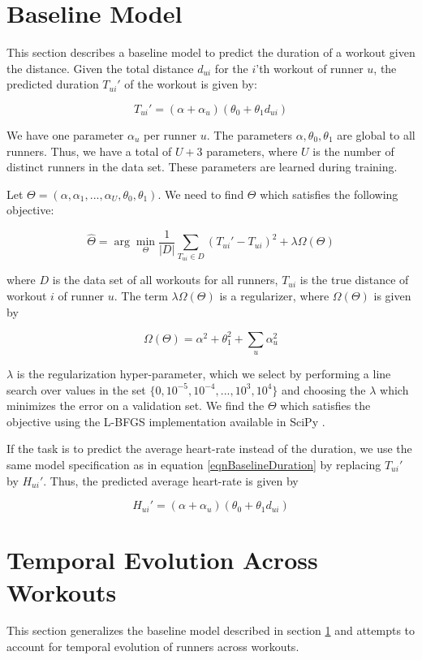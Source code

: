 \documentclass{acm_proc_article-sp}
\begin{document}
\section{Baseline Model}
\label{secBaselineModel}
This section describes a baseline model to predict the duration of a workout given the distance. Given the total distance $d_{ui}$ for the $i$'th workout of runner $u$, the predicted duration $T_{ui}'$ of the workout is given by:

\begin{equation}
\label{eqnBaselineDuration}
T_{ui}' = (\alpha + \alpha_{u})(\theta_0 + \theta_1 d_{ui})
\end{equation}

We have one parameter $\alpha_u$ per runner $u$. The parameters $\alpha, \theta_0, \theta_1$ are global to all runners. Thus, we have a total of $U + 3$ parameters, where $U$ is the number of distinct runners in the data set. These parameters are learned during training.

Let $\Theta = (\alpha, \alpha_1, ... , \alpha_U, \theta_0, \theta_1)$. We need to find $\Theta$ which satisfies the following objective:

$$\hat{\Theta} = \arg\min_{\Theta}\frac{1}{|D|} \sum_{T_{ui} \in D}(T_{ui}' - T_{ui})^2 + \lambda \Omega(\Theta) $$

where $D$ is the data set of all workouts for all runners, $T_{ui}$ is the true distance of workout $i$ of runner $u$. The term $\lambda \Omega(\Theta)$ is a regularizer, where $\Omega(\Theta)$ is given by 

$$\Omega(\Theta) = \alpha^2 + \theta_1^2 + \sum_{u}{\alpha_u^2}$$

$\lambda$ is the regularization hyper-parameter, which we select by performing a line search over values in the set $\{0, 10^{-5}, 10^{-4},...,10^3, 10^{4}\}$ and choosing the $\lambda$ which minimizes the error on a validation set. We find the $\Theta$ which satisfies the objective using the L-BFGS \cite{lbfgs} implementation available in SciPy \cite{scipy}.

If the task is to predict the average heart-rate instead of the duration, we use the same model specification as in equation \ref{eqnBaselineDuration} by replacing $T_{ui}'$ by $H_{ui}'$. Thus, the predicted average heart-rate is given by

$$H_{ui}' = (\alpha + \alpha_{u})(\theta_0 + \theta_1 d_{ui})$$


\section{Temporal Evolution Across \\ Workouts}
\label{secTemporalModelUsers}
This section generalizes the baseline model described in section \ref{secBaselineModel} and attempts to account for temporal evolution of runners across workouts.
\end{document}
